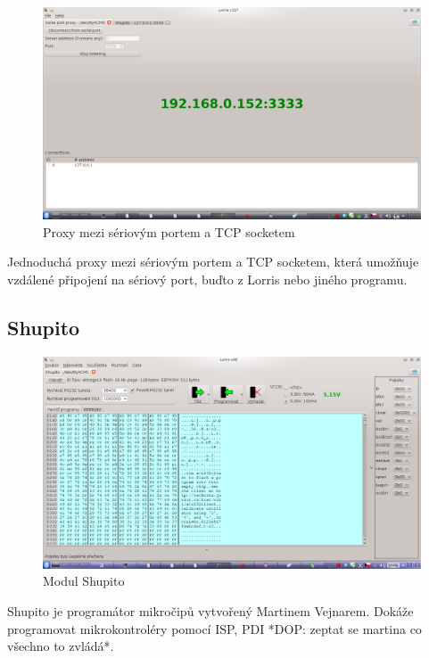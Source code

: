 \documentclass[12pt, a4paper, oneside]{article}
\begin{document}
\begin{figure}[h]
\begin{center}
\includegraphics[width=\textwidth]{img/proxy.png}
\caption{Proxy mezi sériovým portem a TCP socketem}
\label{Shupito}
\end{center}
\end{figure}
Jednoduchá proxy mezi sériovým portem a TCP socketem, která umožňuje vzdálené připojení na sériový port, buďto z Lorris nebo jiného programu.


\newpage
\setlength{\voffset}{0mm} %
\pagestyle{plain}

\subsection*{Shupito}

\begin{figure}[h]
\begin{center}
\includegraphics[width=\textwidth]{img/shupito.png}
\caption{Modul Shupito}
\label{Shupito}
\end{center}
\end{figure}
Shupito je programátor mikročipů vytvořený Martinem Vejnarem. Dokáže programovat mikrokontroléry pomocí ISP, PDI *DOP: zeptat se martina co všechno to zvládá*. 
\end{document}
